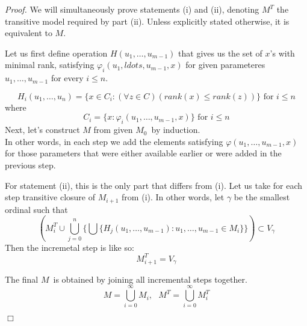 \documentclass[12pt,a4paper]{article}
\newenvironment{proof}
{\noindent \textit{Proof.}}
{\hspace*{\fill} $\Box$}
\begin{document}
\begin{proof}
We will simultaneously prove statements (i) and (ii), denoting $M^T$ the transitive model required by part (ii). Unless explicitly stated otherwise, it is equivalent to $M$.

Let us first define operation $H(u_1, \ldots, u_{m-1})$ that gives us the set of $x$'s with minimal rank, satisfying $\varphi_i(u_1, ldots, u_{m-1}, x)$ for given parameteres $u_1, \ldots, u_{m-1}$ for every $i \leq n$.

\begin{equation}
H_i(u_1, \ldots, u_n) = \{x \in C_i: (\forall z \in C)(rank(x) \leq rank(z))\} \mbox{ for $i \leq n$}
\end{equation}
where
\begin{equation}
C_i = \{x: \varphi_i(u_1, \ldots, u_{m-1}, x)\} \mbox{ for $i \leq n$}
\end{equation}
\medskip
Next, let's construct $M$ from given $M_0$ by induction. 
\begin{equation}
\end{equation}
In other words, in each step we add the elements satisfying $\varphi(u_1, \ldots, u_{m-1}, x)$ for those parameters that were either available earlier or were added in the previous step. 

For statement (ii), this is the only part that differs from (i). Let us take for each step transitive closure of $M_{i+1}$ from (i). In other words, let $\gamma$ be the smallest ordinal such that 
\begin{equation}
(M^T_i \cup \bigcup_{j=0}^{n} \{\bigcup\{H_j(u_1, \ldots, u_{m-1}): u_1, \ldots, u_{m-1} \in M_i\}\}) \subset V_\gamma
\end{equation}
Then the incremetal step is like so:
\begin{equation}
M^T_{i+1} = V_\gamma
\end{equation}

The final $M$ is obtained by joining all incremental steps together. 
\begin{equation}
M = \bigcup_{i=0}^{\infty} M_i, \mbox{  }M^T = \bigcup_{i=0}^{\infty} M^T_i
\end{equation}


\end{proof}
\end{document}
